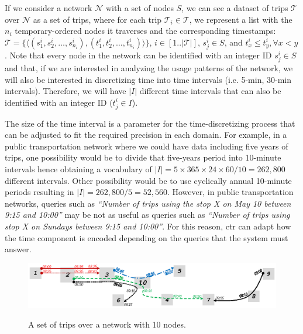 	If we consider a network $\mathcal{N}$ with a set of nodes $S$, 
	we can see a dataset of trips $\mathcal{T}$ over $\mathcal{N}$ as 
	a set of trips, where for each trip $\mathcal{T}_i \in \mathcal{T}$, we represent a list with the 
	$n_i$
	temporary-ordered nodes it traverses and the corresponding timestamps: 
	$\mathcal{T}= \{ \langle (s^i_1, s^i_2, \dots,  s^i_{n_i}),(t^i_1, t^i_2, \dots,  t^i_{n_i}) \rangle\}$, $i\in[1..|\mathcal{T}|]$, 
	$s^i_j \in S$, and $t^i_{x} \leq t^i_y, \forall x < y$. 
	Note that every node in the network can be identified with an integer ID $s^i_j \in S$ and that, if we are interested in
	analyzing the usage patterns of the network, we will also be interested in discretizing time into 
	time intervals (i.e. 5-min, 30-min intervals). Therefore,
	we will have $|I|$ different time intervals that can also be identified with an
	integer ID ($t^i_j \in I$).

	The size of the time interval is a parameter for the time-discretizing process
	that can be adjusted to fit the required precision in each domain.
	For example, in a public
	transportation network where we could have data including five years of trips, one
	possibility would be to divide that five-years period into
	10-minute intervals hence obtaining a
	vocabulary of $|I|=5\times 365 \times 24 \times 60/10 = 262,800$ different intervals. 
	Other possibility would
	be to use cyclically annual 10-minute periods resulting in $|I|=262,800 / 5 = 52,560$. 
	However,  in public transportation networks, queries such
	as \textit{``Number of trips using the stop X on May 10 between 9:15 and 10:00''} may be not 
	as useful as queries such as \textit{``Number of trips using stop X on Sundays between 9:15 and
		10:00''}.
	For this reason, \gls{ctr} can adapt how the
	time component is encoded depending on the queries that the system must answer.

	\begin{figure}[ht]
		\begin{center}
			{\includegraphics[width=1\textwidth]{figures/network_ctr.eps}}
		\end{center}
		\caption{A set of trips over a network with 10 nodes.}
		\label{fig:network}
	\end{figure}

